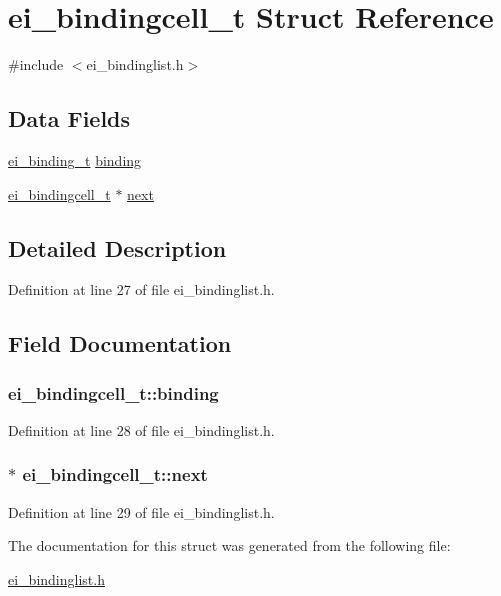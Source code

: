 \hypertarget{structei__bindingcell__t}{\section{ei\-\_\-bindingcell\-\_\-t Struct Reference}
\label{structei__bindingcell__t}
}


{\ttfamily \#include $<$ei\-\_\-bindinglist.\-h$>$}

\subsection*{Data Fields}
\begin{DoxyCompactItemize}
\item 
\hyperlink{structei__binding__t}{ei\-\_\-binding\-\_\-t} \hyperlink{structei__bindingcell__t_ab0a869d8141d4682bf948f834369a2d6}{binding}
\item 
\hyperlink{structei__bindingcell__t}{ei\-\_\-bindingcell\-\_\-t} $\ast$ \hyperlink{structei__bindingcell__t_aeae43a2181c747bdb4d0f83de5bf96dc}{next}
\end{DoxyCompactItemize}


\subsection{Detailed Description}


Definition at line 27 of file ei\-\_\-bindinglist.\-h.



\subsection{Field Documentation}
\hypertarget{structei__bindingcell__t_ab0a869d8141d4682bf948f834369a2d6}{
\subsubsection[{binding}]{ ei\-\_\-bindingcell\-\_\-t\-::binding}}\label{structei__bindingcell__t_ab0a869d8141d4682bf948f834369a2d6}


Definition at line 28 of file ei\-\_\-bindinglist.\-h.

\hypertarget{structei__bindingcell__t_aeae43a2181c747bdb4d0f83de5bf96dc}{
\subsubsection[{next}]{$\ast$ ei\-\_\-bindingcell\-\_\-t\-::next}}\label{structei__bindingcell__t_aeae43a2181c747bdb4d0f83de5bf96dc}


Definition at line 29 of file ei\-\_\-bindinglist.\-h.



The documentation for this struct was generated from the following file\-:\begin{DoxyCompactItemize}
\item 
\hyperlink{ei__bindinglist_8h}{ei\-\_\-bindinglist.\-h}\end{DoxyCompactItemize}
